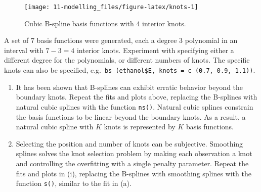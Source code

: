 \documentclass[
]{book}
\newenvironment{Shaded}{\begin{snugshade}}{\end{snugshade}}
\newcommand{\AttributeTok}[1]{\textcolor[rgb]{0.13,0.29,0.53}{#1}}
\newcommand{\CommentTok}[1]{\textcolor[rgb]{0.56,0.35,0.01}{\textit{#1}}}
\newcommand{\ControlFlowTok}[1]{\textcolor[rgb]{0.13,0.29,0.53}{\textbf{#1}}}
\newcommand{\DecValTok}[1]{\textcolor[rgb]{0.00,0.00,0.81}{#1}}
\newcommand{\FunctionTok}[1]{\textcolor[rgb]{0.13,0.29,0.53}{\textbf{#1}}}
\newcommand{\NormalTok}[1]{#1}
\newcommand{\OtherTok}[1]{\textcolor[rgb]{0.56,0.35,0.01}{#1}}
\newcommand{\SpecialCharTok}[1]{\textcolor[rgb]{0.81,0.36,0.00}{\textbf{#1}}}
\newcommand{\StringTok}[1]{\textcolor[rgb]{0.31,0.60,0.02}{#1}}
\begin{document}
\begin{Shaded}
\end{Shaded}

\begin{figure}
\texttt{[image: 11-modelling\_files/figure-latex/knots-1]} \caption{Cubic B-spline basis functions with 4 interior knots.}\label{fig:knots}
\end{figure}

A set of \(7\) basis functions were generated, each a degree \(3\) polynomial in an interval with
\(7 - 3 = 4\) interior knots. Experiment with specifying either a different degree for the polynomials, or different numbers of knots. The specific knots can also be specified, e.g.~\texttt{bs\ (ethanol\$E,\ knots\ =\ c\ (0.7,\ 0.9,\ 1.1))}.

\begin{enumerate}
\def\labelenumi{(\roman{enumi})}
\setcounter{enumi}{1}
\item
  It has been shown that B-splines can exhibit erratic behavior beyond the boundary knots. Repeat the fits and plots above, replacing the B-splines with natural cubic splines with the function \texttt{ns()}. Natural cubic splines constrain the basis functions to be linear beyond the boundary knots. As a result, a natural cubic spline with \(K\) knots is represented by \(K\) basis functions.
\item
  Selecting the position and number of knots can be subjective. Smoothing splines solves the knot selection problem by making each observation a knot and controlling the overfitting with a single penalty parameter. Repeat the fits and plots in (i), replacing the B-splines with smoothing splines with the function \texttt{s()}, similar to the fit in (a).
\end{enumerate}
\end{document}
